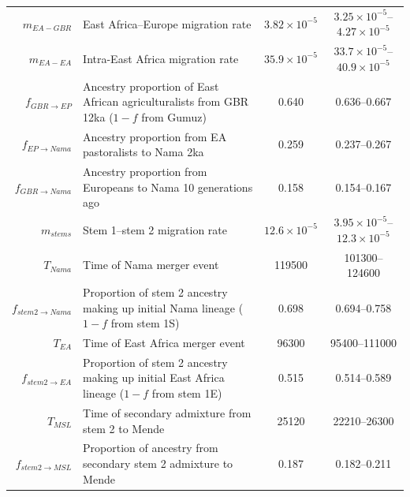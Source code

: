 \documentclass[]{article}
\begin{document}
\begin{table}[ht]
\begin{tabular}[t]{rP{8cm}cc}
    $m_{EA-GBR}$ & East Africa--Europe migration rate & $3.82\times10^{-5}$ & $3.25\times10^{-5}$--$4.27\times10^{-5}$ \\
    $m_{EA-EA}$ & Intra-East Africa migration rate & $35.9\times10^{-5}$ & $33.7\times10^{-5}$--$40.9\times10^{-5}$ \\
    $f_{GBR \rightarrow EP}$ & Ancestry proportion of East African agriculturalists from GBR 12ka ($1-f$ from Gumuz) & 0.640 & 0.636--0.667 \\
    $f_{EP \rightarrow Nama}$ & Ancestry proportion from EA pastoralists to Nama 2ka & 0.259 & 0.237--0.267 \\
    $f_{GBR \rightarrow Nama}$ & Ancestry proportion from Europeans to Nama 10 generations ago & 0.158 & 0.154--0.167 \\
    $m_{stems}$ & Stem 1--stem 2 migration rate & $12.6\times10^{-5}$ & $3.95\times10^{-5}$--$12.3\times10^{-5}$ \\
    $T_{Nama}$ & Time of Nama merger event & 119500 & 101300--124600 \\
    $f_{stem 2 \rightarrow Nama}$ & Proportion of stem 2 ancestry making up initial Nama lineage ($1-f$ from stem 1S) & 0.698 & 0.694--0.758 \\
    $T_{EA}$ & Time of East Africa merger event & 96300 & 95400--111000 \\
    $f_{stem 2 \rightarrow EA}$ & Proportion of stem 2 ancestry making up initial East Africa lineage ($1-f$ from stem 1E) & 0.515 & 0.514--0.589 \\
    $T_{MSL}$ & Time of secondary admixture from stem 2 to Mende & 25120 & 22210--26300 \\
    $f_{stem 2 \rightarrow MSL}$ & Proportion of ancestry from secondary stem 2 admixture to Mende & 0.187 & 0.182--0.211 \\
    \bottomrule
\end{tabular}
\end{table}

\newcommand{\specialcell}[2][c]{%
  \begin{tabular}[#1]{@{}c@{}}#2\end{tabular}}
\end{document}
